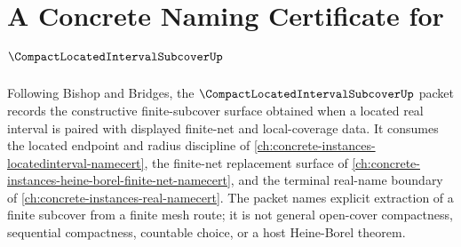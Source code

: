 \chapter{A Concrete Naming Certificate for $\CompactLocatedIntervalSubcoverUp$}
\label{ch:concrete-instances-compact-located-interval-subcover-namecert}

Following Bishop and Bridges, the $\CompactLocatedIntervalSubcoverUp$ packet records the constructive finite-subcover surface obtained when a located real interval is paired with displayed finite-net and local-coverage data. It consumes the located endpoint and radius discipline of \autoref{ch:concrete-instances-locatedinterval-namecert}, the finite-net replacement surface of \autoref{ch:concrete-instances-heine-borel-finite-net-namecert}, and the terminal real-name boundary of \autoref{ch:concrete-instances-real-namecert}. The packet names explicit extraction of a finite subcover from a finite mesh route; it is not general open-cover compactness, sequential compactness, countable choice, or a host Heine-Borel theorem.

